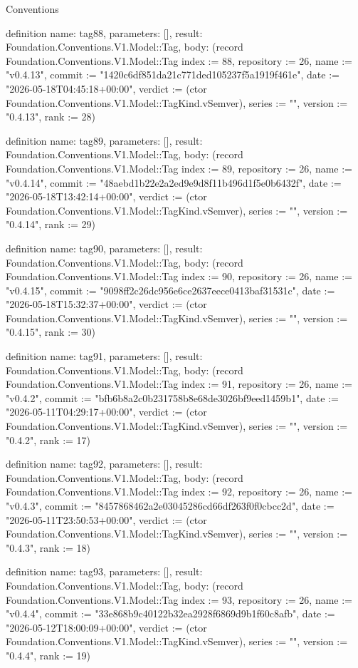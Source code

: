 \begin{lexlean}{Conventions}
\begin{semanticmodule}
definition{
  name: tag88,
  parameters: [],
  result: Foundation.Conventions.V1.Model::Tag,
  body: (record Foundation.Conventions.V1.Model::Tag {index := 88, repository := 26, name := "v0.4.13", commit := "1420c6df851da21c771ded105237f5a1919f461e", date := "2026-05-18T04:45:18+00:00", verdict := (ctor Foundation.Conventions.V1.Model::TagKind.vSemver), series := "", version := "0.4.13", rank := 28})
}

definition{
  name: tag89,
  parameters: [],
  result: Foundation.Conventions.V1.Model::Tag,
  body: (record Foundation.Conventions.V1.Model::Tag {index := 89, repository := 26, name := "v0.4.14", commit := "48aebd1b22e2a2ed9e9d8f11b496d1f5e0b6432f", date := "2026-05-18T13:42:14+00:00", verdict := (ctor Foundation.Conventions.V1.Model::TagKind.vSemver), series := "", version := "0.4.14", rank := 29})
}

definition{
  name: tag90,
  parameters: [],
  result: Foundation.Conventions.V1.Model::Tag,
  body: (record Foundation.Conventions.V1.Model::Tag {index := 90, repository := 26, name := "v0.4.15", commit := "9098ff2c26dc956e6ce2637eece0413baf31531c", date := "2026-05-18T15:32:37+00:00", verdict := (ctor Foundation.Conventions.V1.Model::TagKind.vSemver), series := "", version := "0.4.15", rank := 30})
}

definition{
  name: tag91,
  parameters: [],
  result: Foundation.Conventions.V1.Model::Tag,
  body: (record Foundation.Conventions.V1.Model::Tag {index := 91, repository := 26, name := "v0.4.2", commit := "bfb6b8a2c0b231758b8e68de3026bf9eed1459b1", date := "2026-05-11T04:29:17+00:00", verdict := (ctor Foundation.Conventions.V1.Model::TagKind.vSemver), series := "", version := "0.4.2", rank := 17})
}

definition{
  name: tag92,
  parameters: [],
  result: Foundation.Conventions.V1.Model::Tag,
  body: (record Foundation.Conventions.V1.Model::Tag {index := 92, repository := 26, name := "v0.4.3", commit := "8457868462a2e03045286cd66df263f0f0cbcc2d", date := "2026-05-11T23:50:53+00:00", verdict := (ctor Foundation.Conventions.V1.Model::TagKind.vSemver), series := "", version := "0.4.3", rank := 18})
}

definition{
  name: tag93,
  parameters: [],
  result: Foundation.Conventions.V1.Model::Tag,
  body: (record Foundation.Conventions.V1.Model::Tag {index := 93, repository := 26, name := "v0.4.4", commit := "33e868b9c40122b32ea2928f6869d9b1f60c8afb", date := "2026-05-12T18:00:09+00:00", verdict := (ctor Foundation.Conventions.V1.Model::TagKind.vSemver), series := "", version := "0.4.4", rank := 19})
}


\end{semanticmodule}
\end{lexlean}
